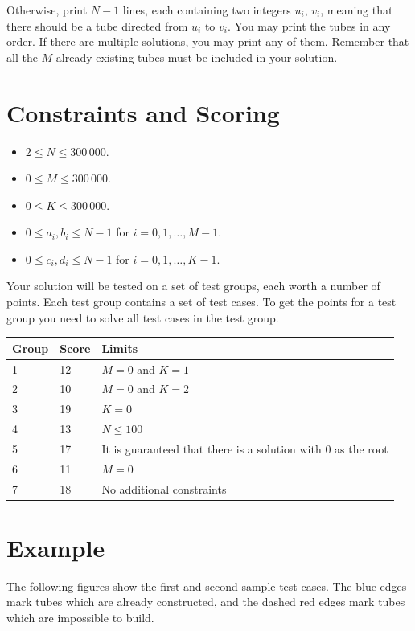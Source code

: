 Otherwise, print $N-1$ lines, each containing two integers $u_i$, $v_i$, meaning that there should be 
a tube directed from $u_i$ to $v_i$.
You may print the tubes in any order. If there are multiple solutions, you may print any of them. 
Remember that all the $M$ already existing tubes must be included in your solution.

\section*{Constraints and Scoring}

\noindent
\begin{itemize}
  \item $2 \leq N \leq 300\,000$.
  \item $0 \leq M \leq 300\,000$.
  \item $0 \leq K \leq 300\,000$.
  \item $0 \leq a_i, b_i \leq N-1$ for $i = 0, 1, \ldots, M-1$.
  \item $0 \leq c_i, d_i \leq N-1$ for $i = 0, 1, \ldots, K-1$.
\end{itemize}

\noindent
Your solution will be tested on a set of test groups, each worth a number of points. 
Each test group contains a set of test cases. To get the points for a test group you need to 
solve all test cases in the test group.

\noindent
\begin{tabular}{| l | l | l |}
\hline
Group & Score & Limits \\ \hline
1     & 12    & $M = 0$ and $K = 1$  \\ \hline
2     & 10    & $M = 0$ and $K = 2$  \\ \hline
3     & 19    & $K = 0$  \\ \hline
4     & 13    & $N \leq 100$  \\ \hline
5     & 17    & It is guaranteed that there is a solution with $0$ as the root \\ \hline
6     & 11    & $M = 0$  \\ \hline
7     & 18    & No additional constraints  \\ \hline
\end{tabular}

\section*{Example}

The following figures show the first and second sample test cases.
The blue edges mark tubes which are already constructed, and the dashed red edges mark tubes which are impossible to build.

